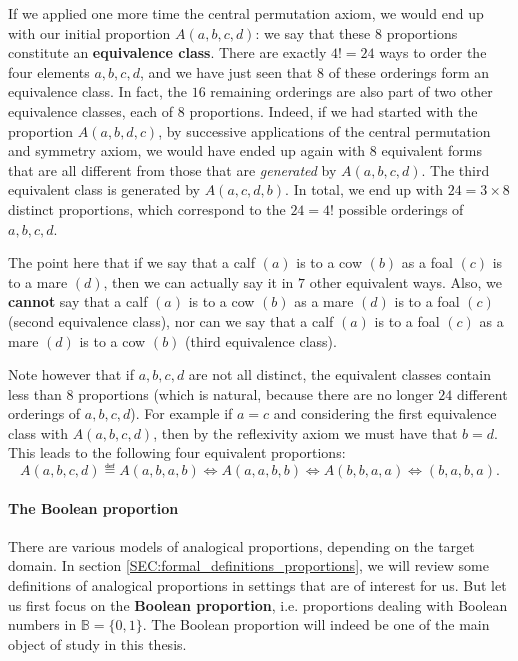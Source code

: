 If we applied one more time the central permutation axiom, we would end up with
our initial proportion $A(a,b,c,d)$: we say that these $8$ proportions
constitute an \textbf{equivalence class}. There are exactly $4! = 24$ ways to
order the four elements $a, b, c, d$, and we have just seen that $8$ of these
orderings form an equivalence class. In fact, the $16$ remaining orderings are
also part of two other equivalence classes, each of $8$ proportions. Indeed, if we had
started with the proportion $A(a,b,d,c)$, by successive applications of the
central permutation and symmetry axiom, we would have ended up again with $8$
equivalent forms that are all different from those that are \textit{generated}
by $A(a, b, c, d)$. The third equivalent class is generated by $A(a, c, d, b)$.
In total, we end up with $24 = 3 \times 8$ distinct proportions, which
correspond to the $24 = 4!$ possible orderings of $a, b, c, d$.

\begin{testexample}
  The point here that if we say that a calf $(a)$ is to a cow $(b)$ as a foal
  $(c)$ is to a mare $(d)$, then we can actually say it in $7$ other equivalent
  ways. Also, we \textbf{cannot} say that a calf $(a)$ is to a cow $(b)$ as a mare $(d)$
  is to a foal $(c)$ (second equivalence class), nor can we say that a calf
  $(a)$ is to a foal $(c)$ as a  mare $(d)$  is to a cow $(b)$ (third
  equivalence class).
\end{testexample}

Note however that if $a, b, c, d$ are not all distinct, the equivalent classes
contain less than $8$ proportions (which is natural, because there are no
longer $24$ different orderings of $a, b, c, d$). For example if $a = c$ and
considering the first equivalence class with $A(a, b, c, d)$, then
by the reflexivity axiom we must have that $b = d$. This leads to the
following four equivalent proportions: $$A(a, b, c, d) \eqdef A(a, b, a, b)
\iff A(a, a, b, b) \iff A(b, b, a, a) \iff (b, a, b, a).$$


\paragraph{The Boolean proportion\\}

There are various models of analogical proportions, depending on the target
domain. In section \ref{SEC:formal_definitions_proportions}, we will review
some definitions of analogical proportions in settings that are of interest for
us. But let us first focus on the \textbf{Boolean proportion}, i.e. proportions
dealing with Boolean numbers in $\mathbb{B} = \{0, 1\}$. The Boolean proportion
will indeed be one of the main object of study in this thesis.

